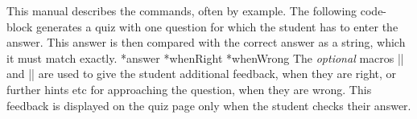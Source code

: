 \documentclass[svgnames]{article}
\makeatletter
\newcommand\macroIndex[1]{%
  \lowercase{\def\temp{#1}}%
  \expandafter\index\expandafter{\temp@\textbackslash#1}%
}
\makeatother
\begin{document}
  This manual describes the \WebQuiz commands, often by example. The
  following code-block generates a quiz with one question for which the
  student has to enter the answer. This answer is then compared with the
  correct answer as a string, which it must match exactly.
    \macroIndex{answer}*{answer}
    *{whenRight}
    *{whenWrong}
    The \textit{optional} macros \LatexCode|\whenRight| and
    \LatexCode|\whenWrong| are used to give the student additional
    feedback, when they are right, or further hints etc for approaching
    the question, when they are wrong. This feedback is displayed on the
    quiz page only when the student checks their answer.
\end{document}
